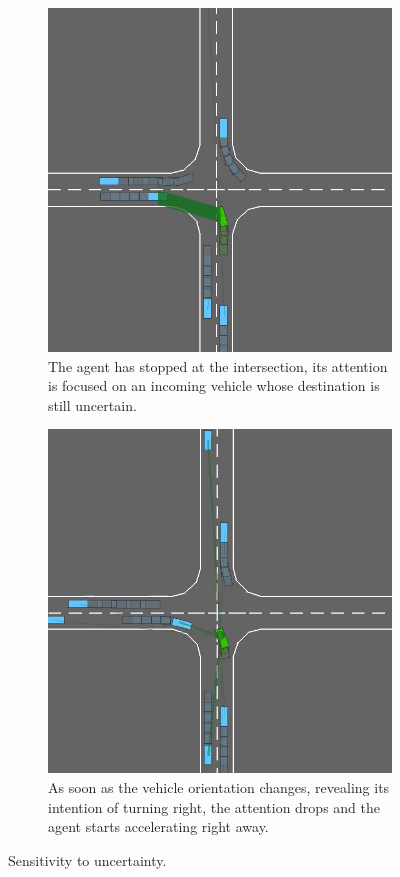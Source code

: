 \begin{figure}[tp]
	\centering
	\begin{subfigure}[b]{0.4\linewidth}
		\includegraphics[width=\linewidth]{img/watch1}
		\caption{The agent has stopped at the intersection, its attention is focused on an incoming vehicle whose destination is still uncertain.}
	\end{subfigure}
	\begin{subfigure}[b]{0.4\linewidth}
		\includegraphics[width=\linewidth]{img/watch2}
		\caption{As soon as the vehicle orientation changes, revealing its intention of turning right, the attention drops and the agent starts accelerating right away.}
	\end{subfigure}
	\caption{Sensitivity to uncertainty.}
	\label{fig:sensitivity}
\end{figure}

